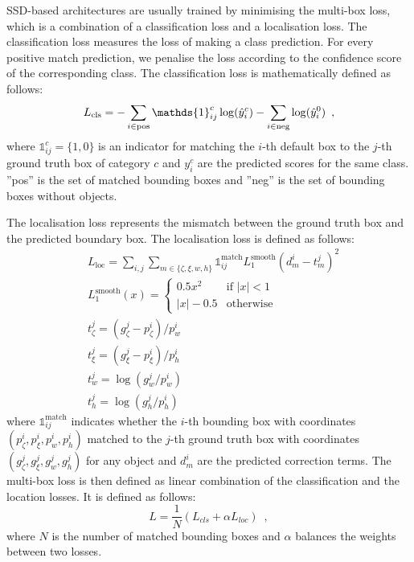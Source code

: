 SSD-based architectures are usually trained by minimising the multi-box loss, which is a combination of a classification loss and a localisation loss.
The classification loss measures the loss of making a class prediction. For every positive match prediction, we penalise the loss according to the confidence score of the corresponding class. The classification loss is mathematically defined as follows:
\begin{equation*}
L_\text{cls} = -\sum_{i \in \text{pos}} \mathds{1}_{ij}^c \log(\hat{y}_i^c) - \sum_{i \in \text{neg}} \log(\hat{y}_i^0)\\
\enspace ,
\end{equation*}
where $\mathds{1}_{ij}^c = \{1, 0\}$ is an indicator for matching the $i$-th default box to the $j$-th ground truth box of category $c$ and $y_i^c$ are the predicted scores for the same class. ''pos'' is the set of matched bounding boxes and ''neg'' is the set of bounding boxes without objects. 

The localisation loss represents the mismatch between the ground truth box and the predicted boundary box. The localisation loss is defined as follows: 
\begin{equation*}
    \begin{aligned}
        &L_\text{loc} = \sum_{i,j} \sum_{m\in\{\zeta,\xi, w, h\}} \mathds{1}_{ij}^\text{match}
        L_1^\text{smooth}(d_m^i - t_m^j)^2\\
        &L_1^\text{smooth}(x) = \begin{cases}
        0.5 x^2             & \text{if } \vert x \vert < 1\\
        \vert x \vert - 0.5 & \text{otherwise}
        \end{cases} \\
        &t^j_{\zeta} = (g^j_{\zeta} - p^i_{\zeta}) / p^i_w \\
        &t^j_{\xi} = (g^j_{\xi} - p^i_{\xi}) / p^i_h \\
        &t^j_w = \log(g^j_w / p^i_w) \\
        &t^j_h = \log(g^j_h / p^i_h)
    \end{aligned}    
\end{equation*}
where $\mathds{1}_{ij}^\text{match}$ indicates whether the $i$-th bounding box with coordinates $(p^i_{\zeta}, p^i_{\xi}, p^i_w, p^i_h)$ matched to the $j$-th ground truth box with coordinates $(g^j_{\zeta}, g^j_{\xi}, g^j_w, g^j_h)$ for any object and $d_{m}^{i}$ are the predicted correction terms. 
%    
The multi-box loss is then defined as linear combination of the classification and the location losses. It is defined as follows: 
\begin{equation*}
    L = \frac{1}{N} (L_{cls} + \alpha L_{loc})
    \enspace ,
\end{equation*}
%
where $N$ is the number of matched bounding boxes and $\alpha$ balances the weights between two losses.

